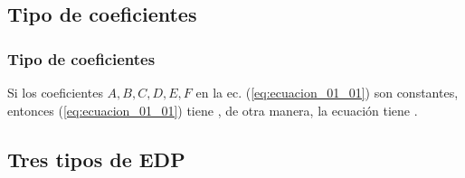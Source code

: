 \documentclass[12pt]{beamer}
\begin{document}
\subsection*{Tipo de coeficientes}

\begin{frame}
\frametitle{Tipo de coeficientes}
Si los coeficientes $A, B, C, D, E, F$ en la ec. (\ref{eq:ecuacion_01_01}) son constantes, entonces (\ref{eq:ecuacion_01_01}) tiene , \pause de otra manera, la ecuación tiene .
\end{frame}

\subsection{Tres tipos de EDP}
\end{document}
